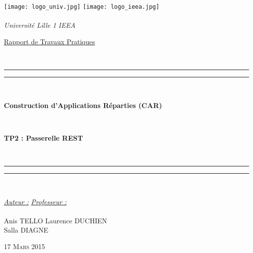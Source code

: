 \thispagestyle{cover}

\texttt{[image: logo\_univ.jpg]} \hfill \texttt{[image: logo\_ieea.jpg]} \\
~\\
\hspace*{0.5cm} {\Large \textit{Université Lille 1}} \hfill {\Large \textit{IEEA}} \hspace*{0.5cm}\\

\vspace*{17mm}

\begin{center}
	\begin{Huge} \underline{Rapport de Travaux Pratiques} \end{Huge}\\[4mm]

	\vspace*{15mm}

	\rule[0.5ex]{\linewidth}{2pt}\vspace*{-\baselineskip}\vspace*{3.2pt}
	\rule[0.5ex]{\linewidth}{1pt}\\[\baselineskip]

		\begin{Huge} \textbf{Construction d'Applications Réparties (CAR)} \end{Huge}\\[4mm]
		\begin{Huge} \textbf{TP2 : Passerelle REST} \end{Huge}\\[4mm]

	\rule[0.5ex]{\linewidth}{1pt}\vspace*{-\baselineskip}\vspace{3.2pt}
	\rule[0.5ex]{\linewidth}{2pt}\\

	\vspace*{20mm}

	{\large \textit{\underline{Auteur :}}} \hfill {\large \textit{\underline{Professeur :}}}\\
	~\\
	{\large Anis TELLO} \hfill {\large Laurence DUCHIEN}\\
	{\large Salla DIAGNE} \hfill {\large}
	
	\vspace*{20mm}
	
	{\large\textsc{17 Mars 2015}}
\end{center}